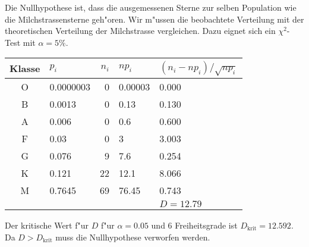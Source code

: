 \begin{loesung}
Die Nullhypothese ist, dass die ausgemessenen Sterne zur selben
Population wie die Milchstrassensterne geh"oren.
Wir m"ussen die beobachtete Verteilung mit der theoretischen Verteilung
der Milchstrasse vergleichen.
Dazu eignet sich ein $\chi^2$-Test mit $\alpha=5\%$.
\begin{center}
\begin{tabular}{|c|l|r|l|l|}
\hline
Klasse&$p_i$    &$n_i$&$np_i$            &$(n_i-np_i)/\sqrt{np_i}$\\
\hline
   O  &0.0000003&    0&\phantom{0}0.00003& 0.000\phantom{03003603}\\
   B  &0.0013   &    0&\phantom{0}0.13   & 0.130\phantom{1561    }\\
   A  &0.006    &    0&\phantom{0}0.6    & 0.600\phantom{7207    }\\
   F  &0.03     &    0&\phantom{0}3      & 3.003\phantom{603     }\\
   G  &0.076    &    9&\phantom{0}7.6    & 0.254\phantom{2371    }\\
   K  &0.121    &   22&12.1              & 8.066\phantom{546     }\\
   M  &0.7645   &   69&76.45             & 0.743\phantom{1121    }\\
\hline
      &         &     &                  &$D=12.79$\\
\hline
\end{tabular}
\end{center}
Der kritische Wert f"ur $D$ f"ur $\alpha = 0.05$ und $6$ Freiheitsgrade
ist $D_{\text{krit}}=12.592$. 
Da $D>D_{\text{krit}}$ muss die Nullhypothese verworfen werden.
\end{loesung}

